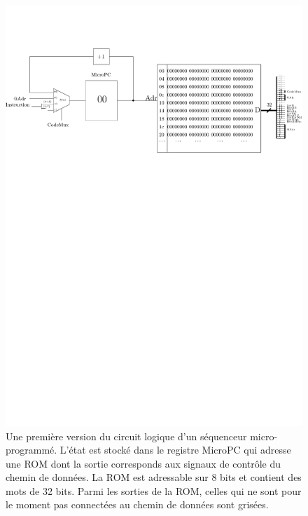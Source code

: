 \begin{figure}[htbp]
\includegraphics[width=\linewidth]{Figs/sequenceur_micro.pdf}
\caption{\label{fig:sequenceur_micro} Une première version du circuit logique d'un séquenceur micro-programmé. L'état est stocké dans le registre MicroPC qui adresse une ROM dont la sortie corresponds aux signaux de contrôle du chemin de données. La ROM est adressable sur 8 bits et contient des mots de 32 bits. Parmi les sorties de la ROM, celles qui ne sont pour le moment pas connectées au chemin de données sont grisées.}
\end{figure}

